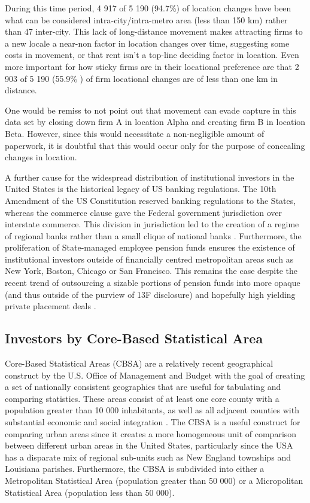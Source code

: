 During this time period, 4 917 of 5 190 (94.7\%) of location changes have been what can be considered intra-city/intra-metro area (less than 150 km) rather than 
47 inter-city.  This lack of long-distance movement makes attracting firms to a new locale a near-non factor in location changes over time, suggesting some costs in movement, or that rent isn't a top-line deciding factor in location.  Even more important for how sticky firms are in their locational preference are that 2 903 of 5 190 (55.9\% ) of firm locational changes are of less than one km in distance.

One would be remiss to not point out that movement can evade capture in this data set by closing down firm A in location Alpha and creating firm B in location Beta.  However, since this would necessitate a non-negligible amount of paperwork, it is doubtful that this would occur only for the purpose of concealing changes in location.   



A further cause for the widespread distribution of institutional investors in the United States is the historical legacy of US banking regulations.  The 10th Amendment of the US Constitution reserved banking regulations to the States, whereas the commerce clause gave the Federal government jurisdiction over interstate commerce.  This division in jurisdiction led to the creation of a regime of regional banks rather than a small clique of national banks \citep{Calomiris2000}. Furthermore, the proliferation of State-managed employee pension funds ensures the existence of institutional investors outside of financially centred metropolitan areas such as New York, Boston, Chicago or San Francisco.  This remains the case despite the recent trend of outsourcing a sizable portions of pension funds into more opaque (and thus outside of the purview of 13F disclosure) and hopefully high yielding private placement deals \cite{lerner2019investing}. 




\subsection{Investors by Core-Based Statistical Area}


Core-Based Statistical Areas (CBSA) are a relatively recent geographical construct by the U.S. Office of Management and Budget with the goal of creating a set of nationally consistent geographies that are useful for tabulating and comparing statistics.  These areas consist of at least one core county with a population greater than 10 000 inhabitants, as well as all adjacent counties with substantial economic and social integration \citep{USCensusCBSAdef}.  The CBSA is a useful construct for comparing urban areas since it creates a more homogeneous unit of comparison between different urban areas in the United States, particularly since the USA has a disparate mix of regional sub-units such as New England townships and Louisiana parishes.  Furthermore, the CBSA is subdivided into either a Metropolitan Statistical Area (population greater than 50 000) or a Micropolitan Statistical Area (population less than 50 000).  

